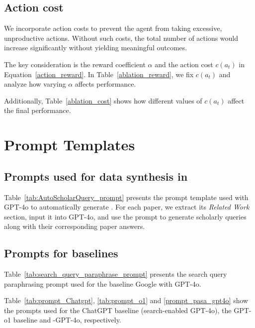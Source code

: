 \subsection{Action cost}

We incorporate action costs to prevent the agent from taking excessive, unproductive actions. Without such costs, the total number of actions would increase significantly without yielding meaningful outcomes. 

The key consideration is the reward coefficient $\alpha$ and the action cost $c(a_t)$ in Equation~\ref{action_reward}. In Table~\ref{ablation_reward}, we fix $c(a_t)$ and analyze how varying $\alpha$ affects performance.

Additionally, Table~\ref{ablation_cost} shows how different values of $c(a_t)$ affect the final performance.

\section{Prompt Templates}

\subsection{Prompts used for data synthesis in \autoS}\label{autoS_prompt}

Table~\ref{tab:AutoScholarQuery_prompt} presents the prompt template used with GPT-4o to automatically generate \autoS. For each paper, we extract its \emph{Related Work} section, input it into GPT-4o, and use the prompt to generate scholarly queries along with their corresponding paper answers.

\subsection{Prompts for baselines}\label{prompt_templates}

Table~\ref{tab:search_query_paraphrase_prompt} presents the search query paraphrasing prompt used for the baseline Google with GPT-4o.

Table~\ref{tab:prompt_Chatgpt}, \ref{tab:prompt_o1} and \ref{prompt_pasa_gpt4o} show the prompts used for the ChatGPT baseline (search-enabled GPT-4o), the GPT-o1 baseline and \pasa-GPT-4o, respectively.

